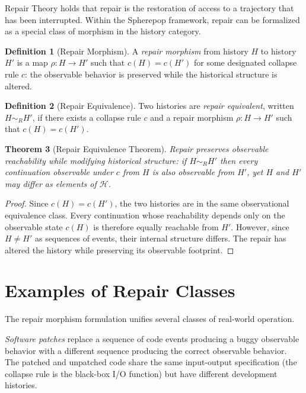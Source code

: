 \documentclass[12pt, a4paper, openany]{book}
\theoremstyle{plain}
\newtheorem{theorem}{Theorem}[chapter]
\theoremstyle{definition}
\newtheorem{definition}[theorem]{Definition}
\theoremstyle{remark}
\newcommand{\calH}{\mathcal{H}}
\begin{document}
Repair Theory holds that repair is the restoration of access to a trajectory
that has been interrupted. Within the Spherepop framework, repair can be
formalized as a special class of morphism in the history category.

\begin{definition}[Repair Morphism]
A \emph{repair morphism} from history $H$ to history $H'$ is a map
$\rho : H \to H'$ such that $c(H) = c(H')$ for some designated collapse rule
$c$: the observable behavior is preserved while the historical structure is altered.
\end{definition}

\begin{definition}[Repair Equivalence]
Two histories are \emph{repair equivalent}, written $H \sim_R H'$, if there
exists a collapse rule $c$ and a repair morphism $\rho : H \to H'$ such that
$c(H) = c(H')$.
\end{definition}

\begin{theorem}[Repair Equivalence Theorem]
Repair preserves observable reachability while modifying historical structure:
if $H \sim_R H'$ then every continuation observable under $c$ from $H$ is
also observable from $H'$, yet $H$ and $H' $ may differ as elements of $\calH$.
\end{theorem}

\begin{proof}
Since $c(H) = c(H')$, the two histories are in the same observational equivalence
class. Every continuation whose reachability depends only on the observable state
$c(H)$ is therefore equally reachable from $H'$. However, since $H \neq H'$ as
sequences of events, their internal structure differs. The repair has altered the
history while preserving its observable footprint.
\end{proof}

\section{Examples of Repair Classes}

The repair morphism formulation unifies several classes of real-world operation.

\emph{Software patches} replace a sequence of code events producing a buggy
observable behavior with a different sequence producing the correct observable
behavior. The patched and unpatched code share the same input-output specification
(the collapse rule is the black-box I/O function) but have different development
histories.
\end{document}
